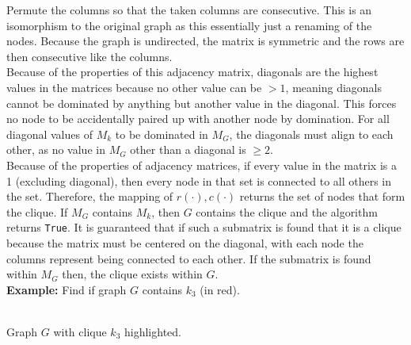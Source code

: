 \documentclass[11pt]{article}
\begin{document}
Permute the columns so that the taken columns are consecutive. This is an isomorphism to the original graph as this essentially just a renaming of the nodes. Because the graph is undirected, the matrix is symmetric and the rows are then consecutive like the columns.\\


Because of the properties of this adjacency matrix, diagonals are the highest values in the matrices because no other value can be $>1$, meaning diagonals cannot be dominated by anything but another value in the diagonal. This forces no node to be accidentally paired up with another node by domination. For all diagonal values of $M_k$ to be dominated in $M_G$, the diagonals must align to each other, as no value in $M_G$ other than a diagonal is $\geq 2$. \\


Because of the properties of adjacency matrices, if every value in the matrix is a 1 (excluding diagonal), then every node in that set is connected to all others in the set. Therefore, the mapping of $r(\cdot),c(\cdot)$ returns the set of nodes that form the clique. If $M_G$ contains $M_k$, then $G$ contains the clique and the algorithm returns \texttt{True}. It is guaranteed that if such a submatrix is found that it is a clique because the matrix must be centered on the diagonal, with each node the columns represent being connected to each other. If the submatrix is found within $M_G$ then, the clique exists within $G$. \lobtomb  \BgThispage \\
 



\pagebreak
\textbf{Example:} Find if graph $G$ contains $k_3$ (in red).\\
\begin{center}
\\



Graph $G$ with clique $k_3$ highlighted.
\end{center}
\end{document}
